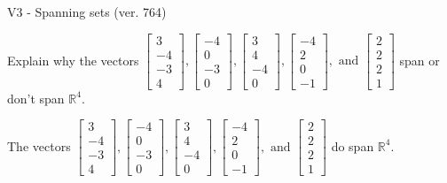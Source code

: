 \begin{exercise}
  \begin{exerciseTitle}V3 - Spanning sets (ver. 764)\end{exerciseTitle}
  \begin{exerciseStatement}
    Explain why the vectors \(\left[\begin{array}{r}
3 \\
-4 \\
-3 \\
4
\end{array}\right] , \left[\begin{array}{r}
-4 \\
0 \\
-3 \\
0
\end{array}\right] , \left[\begin{array}{r}
3 \\
4 \\
-4 \\
0
\end{array}\right] , \left[\begin{array}{r}
-4 \\
2 \\
0 \\
-1
\end{array}\right] , \text{ and } \left[\begin{array}{r}
2 \\
2 \\
2 \\
1
\end{array}\right]\) span or don't span \(\mathbb{R}^4\). 
	


  \end{exerciseStatement}
  \begin{exerciseAnswer}
   The vectors \(\left[\begin{array}{r}
3 \\
-4 \\
-3 \\
4
\end{array}\right] , \left[\begin{array}{r}
-4 \\
0 \\
-3 \\
0
\end{array}\right] , \left[\begin{array}{r}
3 \\
4 \\
-4 \\
0
\end{array}\right] , \left[\begin{array}{r}
-4 \\
2 \\
0 \\
-1
\end{array}\right] , \text{ and } \left[\begin{array}{r}
2 \\
2 \\
2 \\
1
\end{array}\right]\) 
  	 do  
	span \(\mathbb{R}^4\).
  


  \end{exerciseAnswer}
\end{exercise}